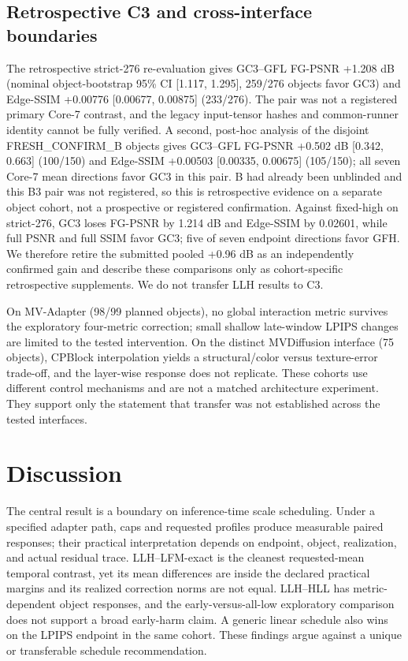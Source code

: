 \documentclass[times,twocolumn,final]{elsarticle}
\begin{document}
\subsection{Retrospective C3 and cross-interface boundaries}

The retrospective strict-276 re-evaluation gives GC3--GFL FG-PSNR +1.208 dB (nominal object-bootstrap 95\% CI [1.117, 1.295], 259/276 objects favor GC3) and Edge-SSIM +0.00776 [0.00677, 0.00875] (233/276). The pair was not a registered primary Core-7 contrast, and the legacy input-tensor hashes and common-runner identity cannot be fully verified. A second, post-hoc analysis of the disjoint FRESH\_CONFIRM\_B objects gives GC3--GFL FG-PSNR +0.502 dB [0.342, 0.663] (100/150) and Edge-SSIM +0.00503 [0.00335, 0.00675] (105/150); all seven Core-7 mean directions favor GC3 in this pair. B had already been unblinded and this B3 pair was not registered, so this is retrospective evidence on a separate object cohort, not a prospective or registered confirmation. Against fixed-high on strict-276, GC3 loses FG-PSNR by 1.214 dB and Edge-SSIM by 0.02601, while full PSNR and full SSIM favor GC3; five of seven endpoint directions favor GFH. We therefore retire the submitted pooled +0.96 dB as an independently confirmed gain and describe these comparisons only as cohort-specific retrospective supplements. We do not transfer LLH results to C3.

On MV-Adapter (98/99 planned objects), no global interaction metric survives the exploratory four-metric correction; small shallow late-window LPIPS changes are limited to the tested intervention. On the distinct MVDiffusion interface (75 objects), CPBlock interpolation yields a structural/color versus texture-error trade-off, and the layer-wise response does not replicate. These cohorts use different control mechanisms and are not a matched architecture experiment. They support only the statement that transfer was not established across the tested interfaces.

\section{Discussion}
\label{sec:discussion}

The central result is a boundary on inference-time scale scheduling. Under a specified adapter path, caps and requested profiles produce measurable paired responses; their practical interpretation depends on endpoint, object, realization, and actual residual trace. LLH--LFM-exact is the cleanest requested-mean temporal contrast, yet its mean differences are inside the declared practical margins and its realized correction norms are not equal. LLH--HLL has metric-dependent object responses, and the early-versus-all-low exploratory comparison does not support a broad early-harm claim. A generic linear schedule also wins on the LPIPS endpoint in the same cohort. These findings argue against a unique or transferable schedule recommendation.
\end{document}

